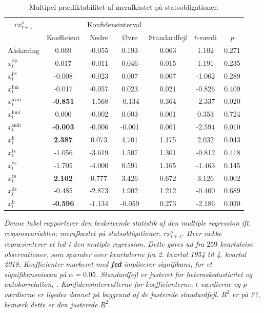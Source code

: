 \documentclass[
  a4paper,
  oneside]{memoir}
\begin{document}
\begin{table}[H]

\caption{\label{tab:MULT-s}Multipel prædiktabilitet af merafkastet på statsobligationer.}
\centering
\begin{threeparttable}
\begin{tabular}[t]{lcccccc}
\toprule
\multicolumn{1}{c}{$rx_{t+1}^{\text{s}}$} & \multicolumn{1}{c}{ } & \multicolumn{2}{c}{Konfidensinterval} & \multicolumn{3}{c}{ } \\
\cmidrule(l{3pt}r{3pt}){1-1} \cmidrule(l{3pt}r{3pt}){3-4}
  & Koefficient & Nedre & Øvre & Standardfejl & $t$-værdi & $p$\\
\midrule
\rowcolor{gray!6}  Afskæring & 0.069 & -0.055 & 0.193 & 0.063 & 1.102 & 0.271\\
$x_t^{\text{dp}}$ & 0.017 & -0.011 & 0.046 & 0.015 & 1.191 & 0.235\\
\rowcolor{gray!6}  $x_t^{\text{pe}}$ & -0.008 & -0.023 & 0.007 & 0.007 & -1.062 & 0.289\\
$x_t^{\text{bm}}$ & -0.017 & -0.057 & 0.023 & 0.021 & -0.826 & 0.409\\
\rowcolor{gray!6}  $x_t^{\text{avar}}$ & \textbf{-0.851} & -1.568 & -0.134 & 0.364 & -2.337 & 0.020\\
$x_t^{\text{hml}}$ & 0.000 & -0.002 & 0.003 & 0.001 & 0.353 & 0.724\\
\rowcolor{gray!6}  $x_t^{\text{smb}}$ & \textbf{-0.003} & -0.006 & -0.001 & 0.001 & -2.594 & 0.010\\
$x_t^{\text{b}}$ & \textbf{ 2.387} & 0.073 & 4.701 & 1.175 & 2.032 & 0.043\\
\rowcolor{gray!6}  $x_t^{\text{ts}}$ & -1.056 & -3.619 & 1.507 & 1.301 & -0.812 & 0.418\\
$x_t^{\text{ys}}$ & -1.705 & -4.000 & 0.591 & 1.165 & -1.463 & 0.145\\
\rowcolor{gray!6}  $x_t^{\text{cs}}$ & \textbf{ 2.102} & 0.777 & 3.426 & 0.672 & 3.126 & 0.002\\
$x_t^{\text{ds}}$ & -0.485 & -2.873 & 1.902 & 1.212 & -0.400 & 0.689\\
\rowcolor{gray!6}  $x_t^{\text{fr}}$ & \textbf{-0.596} & -1.134 & -0.059 & 0.273 & -2.186 & 0.030\\
\bottomrule
\end{tabular}
\begin{tablenotes}
\item \textit{Denne tabel rapporterer den beskrivende statistik af den multiple regression ift. responsvariablen: merafkastet på statsobligationer, $rx_{t+1}^{\text{s}}$. Hver række repræsenterer et led i den mutiple regression. Dette gøres ud fra $259$ kvartalvise observationer, som spænder over kvartalerne fra 2. kvartal 1954 til 4. kvartal 2018. Koefficienter markeret med \textbf{fed} implicerer signifikans, for et signifikansniveau på $\alpha=0.05$. Standardfejl er justeret for heteroskedasticitet og autokorrelation, \citep{Newey1987}. Konfidensintervallerne for koefficienterne, $t$-værdierne og $p$-værdierne er ligedes dannet på baggrund af de justerede standardfejl. $R^2$ er på ??, bemærk dette er den justerede $R^2$.}

\end{tablenotes}
\end{threeparttable}
\end{table}
\end{document}
